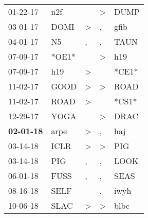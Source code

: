 \begin{supertabular}{p{0.07\textwidth}p{0.06\textwidth}p{0.02\textwidth}p{0.02\textwidth}p{0.06\textwidth}}
          01-22-17\textsuperscript{} &            n2f\textsuperscript{} &                  &     \textgreater &           DUMP\textsuperscript{} \\
          03-01-17\textsuperscript{} &           DOMI\textsuperscript{} &     \textgreater &                , &           gfib\textsuperscript{} \\
          04-01-17\textsuperscript{} &             N5\textsuperscript{} &                , &                , &           TAUN\textsuperscript{} \\
          07-09-17\textsuperscript{} &                            *OE1* &                  &     \textgreater &            h19\textsuperscript{} \\
          07-09-17\textsuperscript{} &            h19\textsuperscript{} &     \textgreater &                  &                            *CE1* \\
          11-02-17\textsuperscript{} &           GOOD\textsuperscript{} &     \textgreater &     \textgreater &           ROAD\textsuperscript{} \\
          11-02-17\textsuperscript{} &           ROAD\textsuperscript{} &     \textgreater &                  &                            *CS1* \\
          12-29-17\textsuperscript{} &           YOGA\textsuperscript{} &                  &     \textgreater &           DRAC\textsuperscript{} \\
 \textbf{02-01-18\textsuperscript{}} &           arpe\textsuperscript{} &     \textgreater &                , &            haj\textsuperscript{} \\
          03-14-18\textsuperscript{} &           ICLR\textsuperscript{} &     \textgreater &     \textgreater &            PIG\textsuperscript{} \\
          03-14-18\textsuperscript{} &            PIG\textsuperscript{} &                , &                , &           LOOK\textsuperscript{} \\
          06-01-18\textsuperscript{} &           FUSS\textsuperscript{} &                , &                , &           SEAS\textsuperscript{} \\
          08-16-18\textsuperscript{} &           SELF\textsuperscript{} &                  &                , &           iwyh\textsuperscript{} \\
          10-06-18\textsuperscript{} &           SLAC\textsuperscript{} &     \textgreater &     \textgreater &           blbc\textsuperscript{} \\

\end{supertabular}
